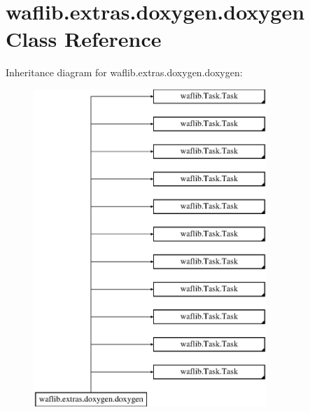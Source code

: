 \hypertarget{classwaflib_1_1extras_1_1doxygen_1_1doxygen}{}\section{waflib.\+extras.\+doxygen.\+doxygen Class Reference}
\label{classwaflib_1_1extras_1_1doxygen_1_1doxygen}
Inheritance diagram for waflib.\+extras.\+doxygen.\+doxygen\+:\begin{figure}[H]
\begin{center}
\leavevmode
\includegraphics[height=12.000000cm]{classwaflib_1_1extras_1_1doxygen_1_1doxygen}
\end{center}
\end{figure}
